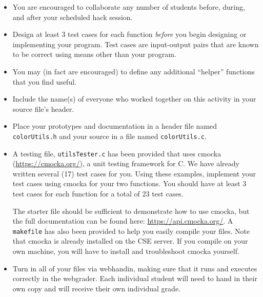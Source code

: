 \documentclass[12pt]{scrartcl}
\begin{document}
\begin{itemize}
  \item You are encouraged to collaborate any number of students 
  before, during, and after your scheduled hack session.  
  \item Design at least 3 test cases for each function
  \emph{before} you begin
  designing or implementing your program.  Test cases are 
  input-output pairs that are known to be correct using means
  other than your program.
  \item You may (in fact are encouraged) to define any additional
  ``helper'' functions that you find useful.
  \item Include the name(s) of everyone who worked together on
  this activity in your source file's header.
  \item Place your prototypes and documentation in a header file 
  named \texttt{colorUtils.h} and your source in a file
  named \texttt{colorUtils.c}.
  
  \item A testing file, \texttt{utilsTester.c} has been 
  provided that uses cmocka (\url{https://cmocka.org/}), a unit testing 
  framework for C.  We have already written several (17) test cases 
  for you.  Using these examples, implement your test cases using cmocka
  for your two functions.  You should have at least 3 test cases for
  each function for a total of 23 test cases.

  The starter file should be sufficient to demonstrate how to use
  cmocka, but the full documentation can be found here: \url{https://api.cmocka.org/}.
  A \texttt{makefile} has also been provided to help
  you easily compile your files.  Note that cmocka is already 
  installed on the CSE server.  If you compile on your own machine, you will
  have to install and troubleshoot cmocka yourself.  
  \item Turn in all of your files via webhandin, making sure that 
  it runs and executes correctly in the webgrader.  Each individual 
  student will need to hand in their own copy and will receive 
  their own individual grade.
\end{itemize}  
\end{document}
